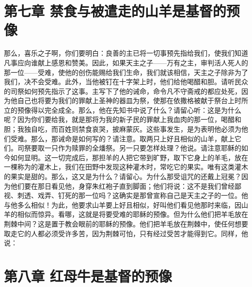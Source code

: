
\section{第七章 禁食与被遣走的山羊是基督的预像}

那么，喜乐之子啊，你们要明白：良善的主已将一切事预先指给我们，使我们知道凡事应向谁献上感恩和赞美。因此，如果天主之子——万有之主，审判活人死人的那一位——受难，使他的创伤能赐给我们生命，我们就该相信，天主之子除非为了我们，决不会受难。此外，当他被钉在十字架上时，他们给他喝醋和胆。请听民众的司祭如何预先指示了这事。主写下了他的诫命，命令凡不守斋戒的都应处死，因为他自己也将要为我们的罪献上圣神的器皿为祭，使那在依撒格被献于祭台上时所立的预像得以完全成全。那么，他在先知书中说了什么？请留心听：这是为什么呢？因为你们要给我，就是那将为我的新子民的罪献上我血肉的那一位，喝醋和胆；我独自吃，而百姓则禁食哀哭，披麻蒙灰。这些事发生，是为表明他必须为他们受难。那么，那诫命是如何写的？请注意。取两只上好且相似的山羊，献上它们。司祭要取一只作为赎罪的全燔祭。另一只要怎样处理？他说。请注意耶稣的如今如何显明。这一切完成后，那担羊的人把它带到旷野，取下它身上的羊毛，放在一棵称为的灌木上，我们在田野中发现这种灌木时，常吃它的果实。唯有这类灌木的果实是甜的。那么，这又是为什么？请留心。为什么那受诅咒的还戴上冠冕？因为他们要在那日看见他，身穿朱红袍子直到脚面；他们将说：这不是我们曾经鄙视、刺透、戏弄、钉死的那一位吗？这确实是那曾宣称自己是天主之子的一位。他与他多么相似！为此，他要求山羊要上好且相似，好叫他们看见他那时来临，因山羊的相似而惊异。看哪，这就是将要受难的耶稣的预像。但为什么他们把羊毛放在荆棘中间？这是置于教会眼前的耶稣的预像。他们把羊毛放在荆棘中，使任何想要取走它的人都必须受许多苦，因为荆棘可怕，只有经过受苦才能得到它。同样，他说： \par


\section{第八章 红母牛是基督的预像}

